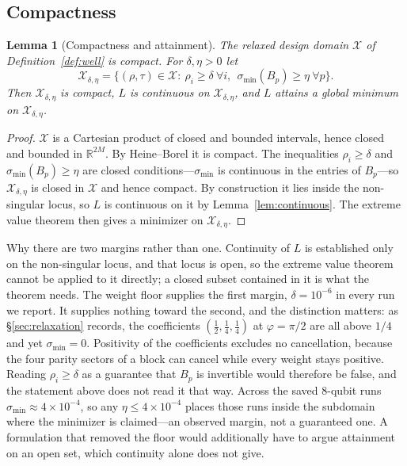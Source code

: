 \documentclass[twocolumn,aps,prl,superscriptaddress,showkeys]{revtex4-2}
\theoremstyle{plain}
\newtheorem{lemma}{Lemma}
\theoremstyle{definition}
\begin{document}
\subsection{Compactness}

\begin{lemma}[Compactness and attainment]
\label{lem:compact}
The relaxed design domain $\mathcal{X}$ of Definition~\ref{def:well} is compact. For $\delta,\eta>0$ let
\[
\mathcal{X}_{\delta,\eta}=\{(\rho,\tau)\in\mathcal{X}:\ \rho_i\ge\delta\ \forall i,\ \ \sigma_{\min}(B_p)\ge\eta\ \forall p\}.
\]
Then $\mathcal{X}_{\delta,\eta}$ is compact, $L$ is continuous on $\mathcal{X}_{\delta,\eta}$, and $L$ attains a global minimum on $\mathcal{X}_{\delta,\eta}$.
\end{lemma}
\begin{proof}
$\mathcal{X}$ is a Cartesian product of closed and bounded intervals, hence closed and bounded in $\mathbb{R}^{2M}$. By Heine--Borel it is compact. The inequalities $\rho_i\ge\delta$ and $\sigma_{\min}(B_p)\ge\eta$ are closed conditions---$\sigma_{\min}$ is continuous in the entries of $B_p$---so $\mathcal{X}_{\delta,\eta}$ is closed in $\mathcal{X}$ and hence compact. By construction it lies inside the non-singular locus, so $L$ is continuous on it by Lemma~\ref{lem:continuous}. The extreme value theorem then gives a minimizer on $\mathcal{X}_{\delta,\eta}$.
\end{proof}

Why there are two margins rather than one. Continuity of $L$ is established only on the non-singular locus, and that locus is open, so the extreme value theorem cannot be applied to it directly; a closed subset contained in it is what the theorem needs. The weight floor supplies the first margin, $\delta=10^{-6}$ in every run we report. It supplies nothing toward the second, and the distinction matters: as \S\ref{sec:relaxation} records, the coefficients $(\tfrac12,\tfrac14,\tfrac14)$ at $\varphi=\pi/2$ are all above $1/4$ and yet $\sigma_{\min}=0$. Positivity of the coefficients excludes no cancellation, because the four parity sectors of a block can cancel while every weight stays positive. Reading $\rho_i\ge\delta$ as a guarantee that $B_p$ is invertible would therefore be false, and the statement above does not read it that way. Across the saved 8-qubit runs $\sigma_{\min}\approx4\times10^{-4}$, so any $\eta\le4\times10^{-4}$ places those runs inside the subdomain where the minimizer is claimed---an observed margin, not a guaranteed one. A formulation that removed the floor would additionally have to argue attainment on an open set, which continuity alone does not give.
\end{document}
